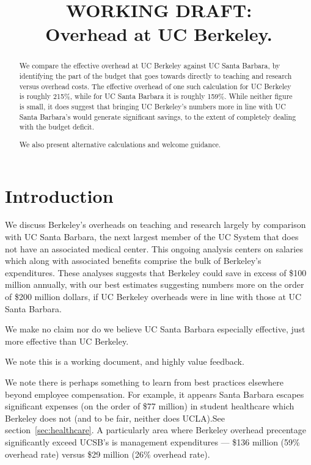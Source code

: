 \documentclass{article}
\title{{\bf WORKING DRAFT:}\\  Overhead at UC Berkeley.}
\author{}
\begin{document}
\maketitle

\begin{abstract}

We compare the effective overhead at UC Berkeley against UC Santa
Barbara, by identifying the part of the budget that goes towards
directly to teaching and research versus overhead costs. The effective
overhead of one such calculation for UC Berkeley is roughly 215\%, while
for UC Santa Barbara it is roughly 159\%. While neither figure is
small, it does suggest that bringing UC Berkeley's numbers more in
line with UC Santa Barbara's would generate significant savings, to
the extent of completely dealing with the budget deficit.

We also present alternative calculations and welcome guidance.

\end{abstract}

\section{Introduction}

We discuss Berkeley's overheads on teaching and research largely by
comparison with UC Santa Barbara, the next largest member of the UC
System that does not have an associated medical center. This ongoing
analysis centers on salaries which along with associated benefits
comprise the bulk of Berkeley's expenditures. These analyses suggests
that Berkeley could save in excess of \$100 million annually, with our
best estimates suggesting numbers more on the order of \$200 million
dollars, if UC Berkeley overheads were in line with those at UC
Santa Barbara.

We make no claim nor do we believe UC Santa Barbara especially
effective, just more effective than UC Berkeley. 

We note this is a working document, and highly value feedback.

We note there is perhaps something to learn from best practices
elsewhere beyond employee compensation. For example, it appears Santa
Barbara escapes significant expenses (on the order of \$77 million) in student
healthcare which Berkeley does not (and to be fair, neither does
UCLA).See section~\ref{sec:healthcare}. A particularly area where
Berkeley overhead precentage significantly exceed UCSB's is management
expenditures --- \$136 million (59\% overhead rate)
versus \$29 million (26\% overhead rate).
\end{document}
